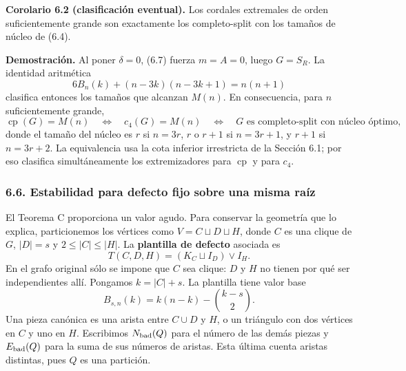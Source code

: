 \documentclass[spanish,11pt,a4paper]{article}
\begin{document}

\textbf{Corolario 6.2 (clasificación eventual).} Los cordales extremales de orden suficientemente grande son exactamente los completo-split con los tamaños de núcleo de (6.4).

\textbf{Demostración.} Al poner \(\delta=0\), (6.7) fuerza \(m=A=0\), luego \(G=S_R\). La identidad aritmética \[
6B_n(k)+(n-3k)(n-3k+1)=n(n+1)
\tag{6.8}
\] clasifica entonces los tamaños que alcanzan \(M(n)\). En consecuencia, para \(n\) suficientemente grande, \[
\operatorname{cp}(G)=M(n)
\quad\Longleftrightarrow\quad
c_4(G)=M(n)
\quad\Longleftrightarrow\quad
G\text{ es completo-split con núcleo óptimo},
\tag{6.9}
\] donde el tamaño del núcleo es \(r\) si \(n=3r\), \(r\) o \(r+1\) si \(n=3r+1\), y \(r+1\) si \(n=3r+2\). La equivalencia usa la cota inferior irrestricta de la Sección 6.1; por eso clasifica simultáneamente los extremizadores para \(\operatorname{cp}\) y para \(c_4\).

\subsubsection{6.6. Estabilidad para defecto fijo sobre una misma raíz}\label{estabilidad-para-defecto-fijo-sobre-una-misma-raiz}

El Teorema C proporciona un valor agudo. Para conservar la geometría que lo explica, particionemos los vértices como \(V=C\sqcup D\sqcup H\), donde \(C\) es una clique de \(G\), \(|D|=s\) y \(2\le |C|\le |H|\). La \textbf{plantilla de defecto} asociada es \[
T(C,D,H)=(K_C\sqcup I_D)\vee I_H.
\] En el grafo original sólo se impone que \(C\) sea clique: \(D\) y \(H\) no tienen por qué ser independientes allí. Pongamos \(k=|C|+s\). La plantilla tiene valor base \[
B_{s,n}(k)=k(n-k)-\binom{k-s}{2}.
\tag{6.10}
\] Una pieza canónica es una arista entre \(C\cup D\) y \(H\), o un triángulo con dos vértices en \(C\) y uno en \(H\). Escribimos \(N_{\rm bad}(Q)\) para el número de las demás piezas y \(E_{\rm bad}(Q)\) para la suma de sus números de aristas. Esta última cuenta aristas distintas, pues \(Q\) es una partición.
\end{document}
